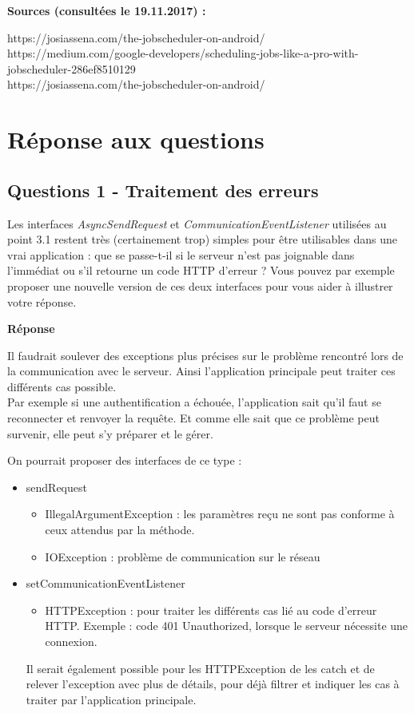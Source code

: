 \documentclass[francais,12pt]{article}
\begin{document}
	\textbf{Sources (consultées le 19.11.2017) :}
	
	https://josiassena.com/the-jobscheduler-on-android/ \\
	https://medium.com/google-developers/scheduling-jobs-like-a-pro-with-jobscheduler-286ef8510129 \\
	https://josiassena.com/the-jobscheduler-on-android/ \\
	
	
	\section*{Réponse aux questions}
	
	\subsection*{Questions 1 - Traitement des erreurs}
	
	Les interfaces \textit{AsyncSendRequest} et \textit{CommunicationEventListener} utilisées au point 3.1 restent très (certainement trop) simples pour être utilisables dans une vrai application : que se passe-t-il si le serveur n'est pas joignable dans l'immédiat ou s'il retourne un code HTTP d'erreur ? Vous pouvez par exemple proposer une nouvelle version de ces deux interfaces pour vous aider à illustrer votre réponse.
	
	{\color[rgb]{0,0.5,0.23}\textbf{Réponse}}
	
	Il faudrait soulever des exceptions plus précises sur le problème rencontré lors de la communication avec le serveur. Ainsi l'application principale peut traiter ces différents cas possible. \\
	Par exemple si une authentification a échouée, l'application sait qu'il faut se reconnecter et renvoyer la requête. Et comme elle sait que ce problème peut survenir, elle peut s'y préparer et le gérer. 
	
	On pourrait proposer des interfaces de ce type : 
	\begin{itemize}
		\item sendRequest
		\begin{itemize}
			\item IllegalArgumentException : les paramètres reçu ne sont pas conforme à ceux attendus par la méthode.
			\item IOException : problème de communication sur le réseau
		\end{itemize}
		\item setCommunicationEventListener
		\begin{itemize}
			\item HTTPException : pour traiter les différents cas lié au code d'erreur HTTP. Exemple : code 401 Unauthorized, lorsque le serveur nécessite une connexion.
		\end{itemize}
	
	Il serait également possible pour les HTTPException de les catch et de relever l'exception avec plus de détails, pour déjà filtrer et indiquer les cas à traiter par l'application principale.
		
	\end{itemize}
	
\end{document}
